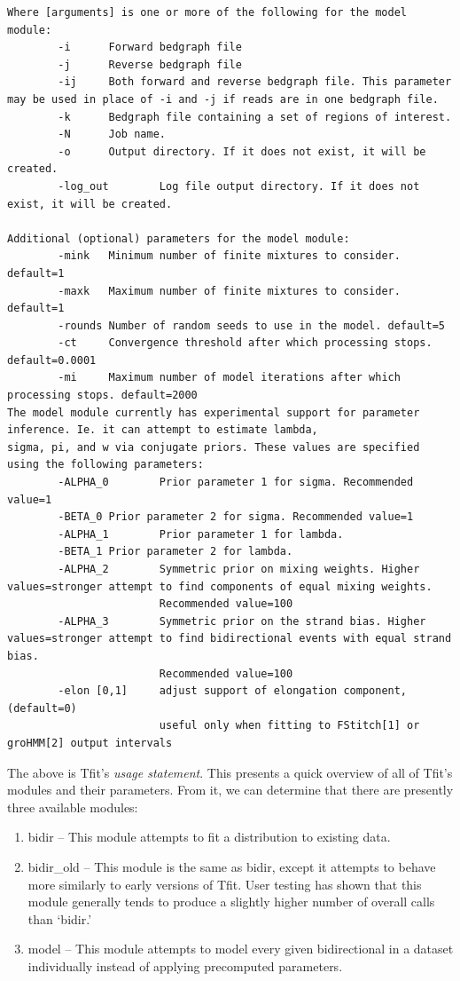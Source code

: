 \documentclass[12pt,letterpaper]{article}
\begin{document}
\begin{lstlisting}
Where [arguments] is one or more of the following for the model module:
        -i      Forward bedgraph file
        -j      Reverse bedgraph file
        -ij     Both forward and reverse bedgraph file. This parameter may be used in place of -i and -j if reads are in one bedgraph file.
        -k      Bedgraph file containing a set of regions of interest.
        -N      Job name.
        -o      Output directory. If it does not exist, it will be created.
        -log_out        Log file output directory. If it does not exist, it will be created.

Additional (optional) parameters for the model module:
        -mink   Minimum number of finite mixtures to consider. default=1
        -maxk   Maximum number of finite mixtures to consider. default=1
        -rounds Number of random seeds to use in the model. default=5
        -ct     Convergence threshold after which processing stops. default=0.0001
        -mi     Maximum number of model iterations after which processing stops. default=2000
The model module currently has experimental support for parameter inference. Ie. it can attempt to estimate lambda,
sigma, pi, and w via conjugate priors. These values are specified using the following parameters:
        -ALPHA_0        Prior parameter 1 for sigma. Recommended value=1
        -BETA_0 Prior parameter 2 for sigma. Recommended value=1
        -ALPHA_1        Prior parameter 1 for lambda.
        -BETA_1 Prior parameter 2 for lambda.
        -ALPHA_2        Symmetric prior on mixing weights. Higher values=stronger attempt to find components of equal mixing weights.
                        Recommended value=100
        -ALPHA_3        Symmetric prior on the strand bias. Higher values=stronger attempt to find bidirectional events with equal strand bias.
                        Recommended value=100
        -elon [0,1]     adjust support of elongation component, (default=0)
                        useful only when fitting to FStitch[1] or groHMM[2] output intervals
\end{lstlisting}

The above is Tfit's \textit{usage statement}. This presents a quick overview of all of Tfit's modules and their parameters. From it, we can determine that there are presently three available modules:
\begin{enumerate}
\item bidir -- This module attempts to fit a distribution to existing data.
\item bidir\_old -- This module is the same as bidir, except it attempts to behave more similarly to early versions of Tfit. User testing has shown that this module generally tends to produce a slightly higher number of overall calls than `bidir.'
\item model -- This module attempts to model every given bidirectional in a dataset individually instead of applying precomputed parameters.
\end{enumerate}
\end{document}
